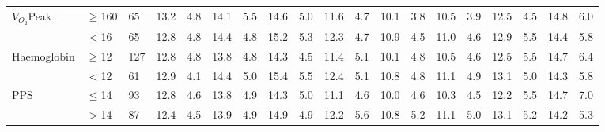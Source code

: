 \begin{sidewaystable}[p]
\begin{tabular}{|l ll | cc cc cc cc cc cc cc cc|}
		$\dot{V}_{O_2}$Peak & $\geq$160 & 65    & 13.2  & 4.8 & 14.1  & 5.5 & 14.6  & 5.0 & 11.6  & 4.7 & 10.1  & 3.8 & 10.5  & 3.9 & 12.5  & 4.5 & 14.8  & 6.0 \\
		                    & $<$16     & 65    & 12.8  & 4.8 & 14.4  & 4.8 & 15.2  & 5.3 & 12.3  & 4.7 & 10.9  & 4.5 & 11.0  & 4.6 & 12.9  & 5.5 & 14.4  & 5.8 \\
		Haemoglobin         & $\geq$12  & 127   & 12.8  & 4.8 & 13.8  & 4.8 & 14.3  & 4.5 & 11.4  & 5.1 & 10.1  & 4.8 & 10.5  & 4.6 & 12.5  & 5.5 & 14.7  & 6.4 \\
		                    & $<$12     & 61    & 12.9  & 4.1 & 14.4  & 5.0 & 15.4  & 5.5 & 12.4  & 5.1 & 10.8  & 4.8 & 11.1  & 4.9 & 13.1  & 5.0 & 14.3  & 5.8 \\
		PPS                 & $\leq$14  & 93    & 12.8  & 4.6 & 13.8  & 4.9 & 14.3  & 5.0 & 11.1  & 4.6 & 10.0  & 4.6 & 10.3  & 4.5 & 12.2  & 5.5 & 14.7  & 7.0 \\
		                    & $>$14     & 87    & 12.4  & 4.5 & 13.9  & 4.9 & 14.9  & 4.9 & 12.2  & 5.6 & 10.8  & 5.2 & 11.1  & 5.0 & 13.1  & 5.2 & 14.2  & 5.3 \\ \hline
	\end{tabular}	
\end{sidewaystable}













